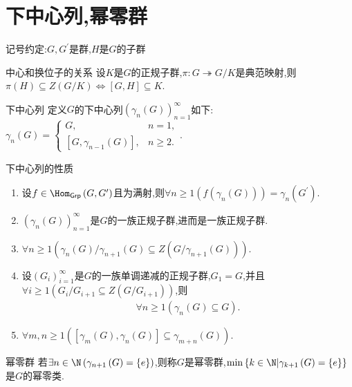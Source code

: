 \section{下中心列,幂零群}

记号约定:$G,G^{\prime}$是群,$H$是$G$的子群


\begin{lemma}{中心和换位子的关系}{}
	设$K$是$G$的正规子群,$\pi:G\twoheadrightarrow G/K$是典范映射,则$\pi\left(H\right)\subseteq Z\left(G/K\right)\iff\left[G,H\right]\subseteq K$.
\end{lemma}

\begin{definition}{下中心列}{}
	定义$G$的下中心列$\left(\gamma_{n}\left(G\right)\right)_{n=1}^{\infty}$如下:$\gamma_{n}\left(G\right)=
	\begin{cases}
		G,&n=1,\\
		\left[G,\gamma_{n-1}\left(G\right)\right],&n\geq 2.
	\end{cases}$.
\end{definition}

\begin{proposition}{下中心列的性质}{}
	\begin{enumerate}
		\item 设$f\in\Hom_{\mathsf{Grp}}\left(G,G^{\prime}\right)$且为满射,则$\forall n\geq 1\left(f\left(\gamma_{n}\left(G\right)\right)\right)=\gamma_{n}\left(G^{\prime}\right)$.
		\item $\left(\gamma_{n}\left(G\right)\right)_{n=1}^{\infty}$是$G$的一族正规子群,进而是一族正规子群.
		\item $\forall n\geq 1\left(\gamma_{n}\left(G\right)/\gamma_{n+1}\left(G\right)\subseteq Z\left(G/\gamma_{n+1}\left(G\right)\right)\right)$.
		\item 设$\left(G_{i}\right)_{i=1}^{\infty}$是$G$的一族单调递减的正规子群,$G_{1}=G$,并且$\forall i\geq 1\left(G_{i}/G_{i+1}\subseteq Z\left(G/G_{i+1}\right)\right)$,则
		\begin{align*}
			\forall n\geq 1\left(\gamma_{n}\left(G\right)\subseteq G\right).
		\end{align*}
		\item $\forall m,n\geq 1\left(\left[\gamma_{m}\left(G\right),\gamma_{n}\left(G\right)\right]\subseteq\gamma_{m+n}\left(G\right)\right)$.
	\end{enumerate}
\end{proposition}

\begin{definition}{幂零群}{}
	若$\exists n\in\N\left(\gamma_{n+1}\left(G\right)=\left\{e\right\}\right)$,则称$G$是幂零群,$\min\left\{k\in\N\middle|\gamma_{k+1}\left(G\right)=\left\{e\right\}\right\}$是$G$的幂零类.
\end{definition}

